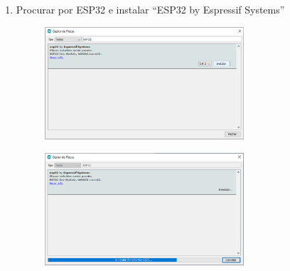\documentclass{article}
\begin{document}
\begin{enumerate}
\item
Procurar por ESP32 e instalar ``ESP32 by Espressif Systems''
\begin{figure}[htb!]
\centering
\includegraphics[width=0.7\textwidth]{Figuras/Fig4.png}
\label{fig:fig4}
\end{figure}
\begin{figure}[htb!]
\centering
\includegraphics[width=0.7\textwidth]{Figuras/Fig5.png}
\label{fig:fig5}
\end{figure}
\end{enumerate}
\end{document}
